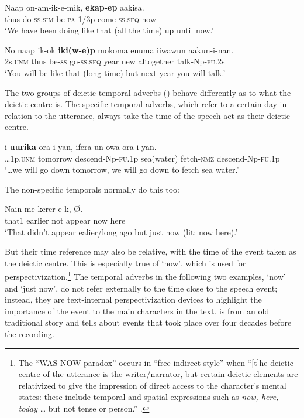 \ea%
\label{ex:6:x1941}
\gll Naap  on-am-ik-e-mik,  \textbf{ekap-ep} aakisa. \\
thus  do-\textsc{ss}.\textsc{sim}-be-\textsc{pa}-1/3p  come-\textsc{ss}.\textsc{seq}  now\\
\glt `We have been doing like that (all the time) up until now.'
\z

\ea%
\label{ex:6:x1942}
\gll No  naap  ik-ok  \textbf{iki(w-e)p}  mokoma  enuma  iiwawun aakun-i-nan.\\
2s.\textsc{unm}  thus  be-\textsc{ss}  go-\textsc{ss}.\textsc{seq}  year  new  altogether talk-Np-\textsc{fu}.2s\\
\glt `You will be like that (long time) but next year you will talk.'
\z

The two groups of deictic temporal adverbs () behave differently as to what the deictic centre is. The specific temporal adverbs, which refer to a certain day in relation to the utterance, always take the time of the speech act as their deictic centre. 

\ea%
\label{ex:6:x1889}
\gll {\dots}i  \textbf{uurika}  ora-i-yan,  ifera  un-owa ora-i-yan.\\
{\dots}1p.\textsc{unm}  tomorrow  descend-Np-\textsc{fu}.1p  sea(water)  fetch-\textsc{nmz} descend-Np-\textsc{fu}.1p\\
\glt `{\dots}we will go down tomorrow, we will go down to fetch sea water.'
\z

The non-specific temporals normally do this too: 

\ea%
\label{ex:6:x1890}
\gll Nain    me  kerer-e-k,     {\O}. \\
that1  earlier  not  appear  now  here \\
\glt `That didn't appear ealier/long ago but just now (lit: now here).'
\z

But their time reference may also be relative, with the time of the event taken as the deictic centre. This is especially true of  `now', which is used for perspectivization.\footnote{The ``WAS-NOW paradox'' occurs in ``free indirect style'' when ``[t]he deictic centre of the utterance is the writer/narrator, but certain deictic elements are relativized to give the impression of direct access to the character's mental states: these include temporal and spatial expressions such as \textit{now, here, today} {\dots} but not tense or person.'' \citep{MushinEtAl2000}.} The temporal adverbs in the following two examples,  `now' and  `just now', do not refer externally to the time close to the speech event; instead, they are text-internal perspectivization devices to highlight the importance of the event to the main characters in the text.  is from an old traditional story and  tells about events that took place over four decades before the recording. 

